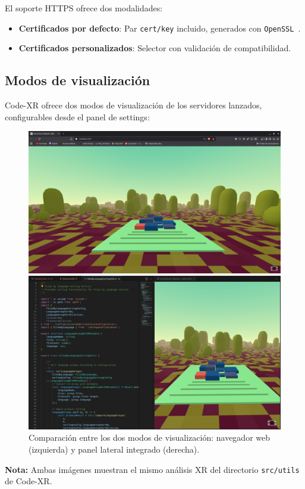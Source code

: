 \documentclass[a4paper, 12pt]{book}
\begin{document}
El soporte HTTPS ofrece dos modalidades:
\begin{itemize}
  \item \textbf{Certificados por defecto}: Par \texttt{cert/key} incluido, generados con \texttt{OpenSSL}~\cite{openssl}.
  \item \textbf{Certificados personalizados}: Selector con validación de compatibilidad.
\end{itemize}

\subsection{Modos de visualización}
Code-XR ofrece dos modos de visualización de los servidores lanzados, configurables desde el panel de settings:

\begin{figure}[H]
\centering
\begin{minipage}[b]{0.48\textwidth}
\centering
\includegraphics[width=\textwidth]{img/browser-mode.png}
\end{minipage}
\hfill
\begin{minipage}[b]{0.48\textwidth}
\centering
\includegraphics[width=\textwidth]{img/panel-mode.png}
\end{minipage}
\caption{Comparación entre los dos modos de visualización: navegador web (izquierda) y panel lateral integrado (derecha).}
\label{fig:visualization-modes}
\end{figure}
\textbf{Nota:} Ambas imágenes muestran el mismo análisis XR del directorio \texttt{src/utils} de Code-XR.
\end{document}
